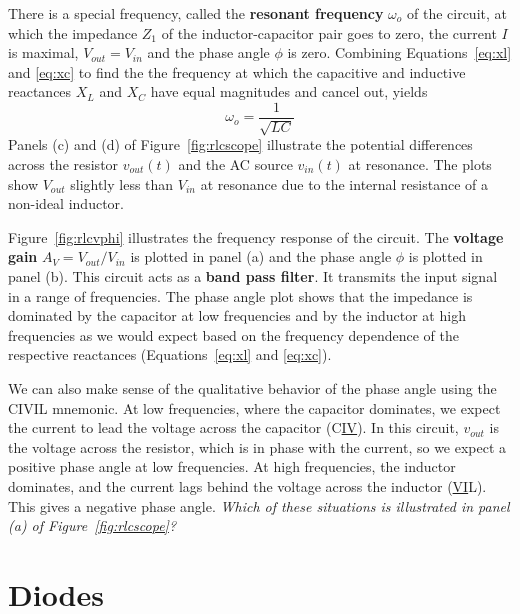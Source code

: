 \documentclass[11pt]{article}
\begin{document}
There is a special frequency, called the \textbf{resonant frequency}
$\omega_o$ of the circuit, at which 
the impedance $Z_1$ of the inductor-capacitor pair goes to zero, the
current $I$ is maximal, $V_{out} = V_{in}$ and the phase angle
$\phi$ is zero. Combining Equations~\ref{eq:xl} and \ref{eq:xc} to
find the the frequency at which the capacitive and inductive
reactances $X_L$ and $X_C$ have equal magnitudes and cancel out,
yields  
\begin{equation}
  \omega_o = \frac{1}{\sqrt{LC}}
  \label{eq:rlcomega}
\end{equation}
Panels (c) and (d) of Figure~\ref{fig:rlcscope} illustrate the
potential differences across the resistor $v_{out}(t)$ and the AC
source $v_{in}(t)$ at resonance. The plots show $V_{out}$ slightly
less than $V_{in}$ at resonance due to the internal resistance of a
non-ideal inductor.

Figure~\ref{fig:rlcvphi} illustrates the frequency response of the
circuit. The \textbf{voltage gain} $A_V = V_{out}/V_{in}$ is plotted
in panel (a) and the phase angle $\phi$ is plotted in panel (b). This
circuit acts as a \textbf{band pass filter}. It transmits the input
signal in a range of frequencies. The phase angle plot shows that the
impedance is dominated by the capacitor at low frequencies and by the
inductor at high frequencies as we would expect based on the frequency
dependence of the respective reactances (Equations~\ref{eq:xl} and 
\ref{eq:xc}).

We can also make sense of the qualitative behavior of the phase angle
using the CIVIL mnemonic. At low frequencies, where the capacitor
dominates, we expect the current to lead the voltage across the
capacitor (C\underline{IV}). In this circuit, $v_{out}$ is the voltage
across the resistor, which is in phase with the current, so we expect
a positive phase angle at low frequencies. At high frequencies, the
inductor dominates, and the current lags behind the voltage across the
inductor (\underline{VI}L). This gives a negative phase
angle. \emph{Which of these situations is illustrated in panel (a) of
  Figure~\ref{fig:rlcscope}?}

\section{Diodes}
\end{document}
